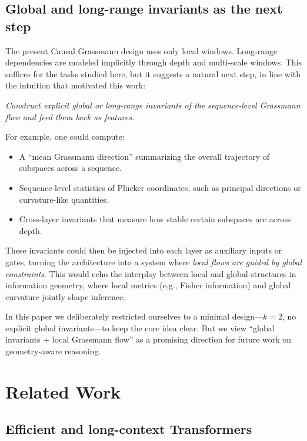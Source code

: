 \documentclass[11pt]{article}
\begin{document}
\subsection{Global and long-range invariants as the next step}

The present Causal Grassmann design uses only local windows. Long-range dependencies are modeled implicitly through depth and multi-scale windows. This suffices for the tasks studied here, but it suggests a natural next step, in line with the intuition that motivated this work:

\medskip
\noindent\emph{Construct explicit global or long-range invariants of the sequence-level Grassmann flow and feed them back as features.}
\medskip

For example, one could compute:

\begin{itemize}
    \item A ``mean Grassmann direction'' summarizing the overall trajectory of subspaces across a sequence.
    \item Sequence-level statistics of Pl\"ucker coordinates, such as principal directions or curvature-like quantities.
    \item Cross-layer invariants that measure how stable certain subspaces are across depth.
\end{itemize}

These invariants could then be injected into each layer as auxiliary inputs or gates, turning the architecture into a system where \emph{local flows are guided by global constraints}. This would echo the interplay between local and global structures in information geometry, where local metrics (e.g., Fisher information) and global curvature jointly shape inference.

In this paper we deliberately restricted ourselves to a minimal design---$k=2$, no explicit global invariants---to keep the core idea clear. But we view ``global invariants + local Grassmann flow'' as a promising direction for future work on geometry-aware reasoning.

\section{Related Work}

\subsection{Efficient and long-context Transformers}
\end{document}

